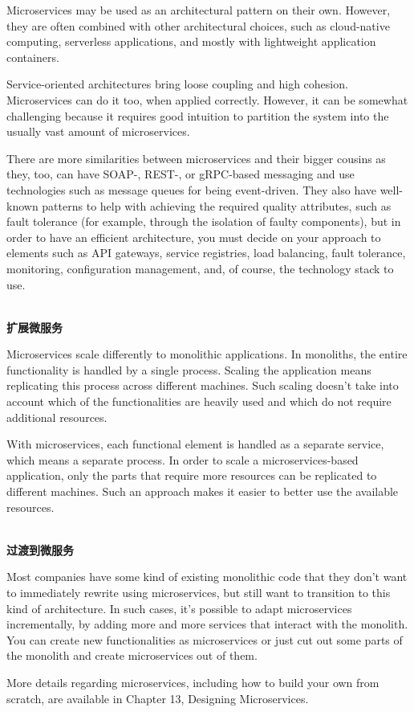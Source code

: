 Microservices may be used as an architectural pattern on their own. However, they are often combined with other architectural choices, such as cloud-native computing, serverless applications, and mostly with lightweight application containers.

Service-oriented architectures bring loose coupling and high cohesion. Microservices can do it too, when applied correctly. However, it can be somewhat challenging because it requires good intuition to partition the system into the usually vast amount of microservices.

There are more similarities between microservices and their bigger cousins as they, too, can have SOAP-, REST-, or gRPC-based messaging and use technologies such as message queues for being event-driven. They also have well-known patterns to help with achieving the required quality attributes, such as fault tolerance (for example, through the isolation of faulty components), but in order to have an efficient architecture, you must decide on your approach to elements such as API gateways, service registries, load balancing, fault tolerance, monitoring, configuration management, and, of course, the technology stack to use.

\hspace*{\fill} \\ %
\noindent
\textbf{扩展微服务}

Microservices scale differently to monolithic applications. In monoliths, the entire functionality is handled by a single process. Scaling the application means replicating this process across different machines. Such scaling doesn't take into account which of the functionalities are heavily used and which do not require additional resources.

With microservices, each functional element is handled as a separate service, which means a separate process. In order to scale a microservices-based application, only the parts that require more resources can be replicated to different machines. Such an approach makes it easier to better use the available resources.


\hspace*{\fill} \\ %
\noindent
\textbf{过渡到微服务}

Most companies have some kind of existing monolithic code that they don't want to immediately rewrite using microservices, but still want to transition to this kind of architecture. In such cases, it's possible to adapt microservices incrementally, by adding more and more services that interact with the monolith. You can create new functionalities as microservices or just cut out some parts of the monolith and create microservices out of them. 

More details regarding microservices, including how to build your own from scratch, are available in Chapter 13, Designing Microservices.













